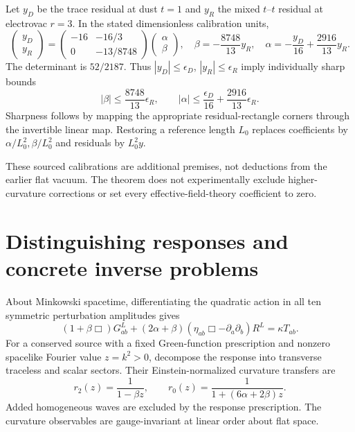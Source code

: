 \documentclass[11pt]{article}
\begin{document}
Let $y_D$ be the trace residual at dust $t=1$ and $y_R$ the mixed $t$--$t$ residual at electrovac $r=3$. In the stated dimensionless calibration units,
\begin{equation}\label{eq:inversequad}
\begin{pmatrix}y_D\\y_R\end{pmatrix}
=\begin{pmatrix}-16&-16/3\\0&-13/8748\end{pmatrix}
\begin{pmatrix}\alpha\\\beta\end{pmatrix},
\quad
\beta=-\frac{8748}{13}y_R,\quad
\alpha=-\frac{y_D}{16}+\frac{2916}{13}y_R.
\end{equation}
The determinant is $52/2187$. Thus $|y_D|\le\epsilon_D$, $|y_R|\le\epsilon_R$ imply individually sharp bounds
\[
|\beta|\le\frac{8748}{13}\epsilon_R,\qquad
|\alpha|\le\frac{\epsilon_D}{16}+\frac{2916}{13}\epsilon_R.
\]
Sharpness follows by mapping the appropriate residual-rectangle corners through the invertible linear map. Restoring a reference length $L_0$ replaces coefficients by $\alpha/L_0^2,\beta/L_0^2$ and residuals by $L_0^2y$.

These sourced calibrations are additional premises, not deductions from the earlier flat vacuum. The theorem does not experimentally exclude higher-curvature corrections or set every effective-field-theory coefficient to zero.

\section{Distinguishing responses and concrete inverse problems}
About Minkowski spacetime, differentiating the quadratic action in all ten symmetric perturbation amplitudes gives
\begin{equation}\label{eq:linear}
(1+\beta\Box)G^L_{ab}+(2\alpha+\beta)(\eta_{ab}\Box-\partial_a\partial_b)R^L
=\kappa T_{ab}.
\end{equation}
For a conserved source with a fixed Green-function prescription and nonzero spacelike Fourier value $z=k^2>0$, decompose the response into transverse traceless and scalar sectors. Their Einstein-normalized curvature transfers are
\begin{equation}\label{eq:transfer}
\boxed{r_2(z)=\frac1{1-\beta z},\qquad
r_0(z)=\frac1{1+(6\alpha+2\beta)z}.}
\end{equation}
Added homogeneous waves are excluded by the response prescription. The curvature observables are gauge-invariant at linear order about flat space.
\end{document}
